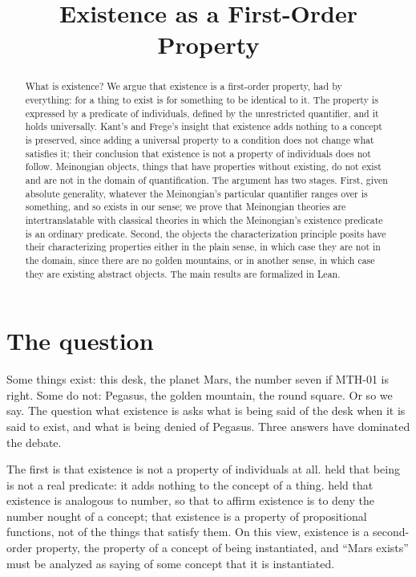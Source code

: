 \documentclass{situationist-preprint}
\title{Existence as a First-Order Property}
\begin{document}
\maketitle

\begin{abstract}
What is existence? We argue that existence is a first-order property, had by everything: for a thing to exist is for something to be identical to it. The property is expressed by a predicate of individuals, defined by the unrestricted quantifier, and it holds universally. Kant's and Frege's insight that existence adds nothing to a concept is preserved, since adding a universal property to a condition does not change what satisfies it; their conclusion that existence is not a property of individuals does not follow. Meinongian objects, things that have properties without existing, do not exist and are not in the domain of quantification. The argument has two stages. First, given absolute generality, whatever the Meinongian's particular quantifier ranges over is something, and so exists in our sense; we prove that Meinongian theories are intertranslatable with classical theories in which the Meinongian's existence predicate is an ordinary predicate. Second, the objects the characterization principle posits have their characterizing properties either in the plain sense, in which case they are not in the domain, since there are no golden mountains, or in another sense, in which case they are existing abstract objects. The main results are formalized in Lean.
\end{abstract}

\section{The question}

Some things exist: this desk, the planet Mars, the number seven if MTH-01 is right. Some do not: Pegasus, the golden mountain, the round square. Or so we say. The question what existence is asks what is being said of the desk when it is said to exist, and what is being denied of Pegasus. Three answers have dominated the debate.

The first is that existence is not a property of individuals at all. \citet[A598/B626]{Kant1787} held that being is not a real predicate: it adds nothing to the concept of a thing. \citet[\S 53]{Frege1884} held that existence is analogous to number, so that to affirm existence is to deny the number nought of a concept; \citet{Russell1918} that existence is a property of propositional functions, not of the things that satisfy them. On this view, existence is a second-order property, the property of a concept of being instantiated, and \enquote{Mars exists} must be analyzed as saying of some concept that it is instantiated.
\end{document}
